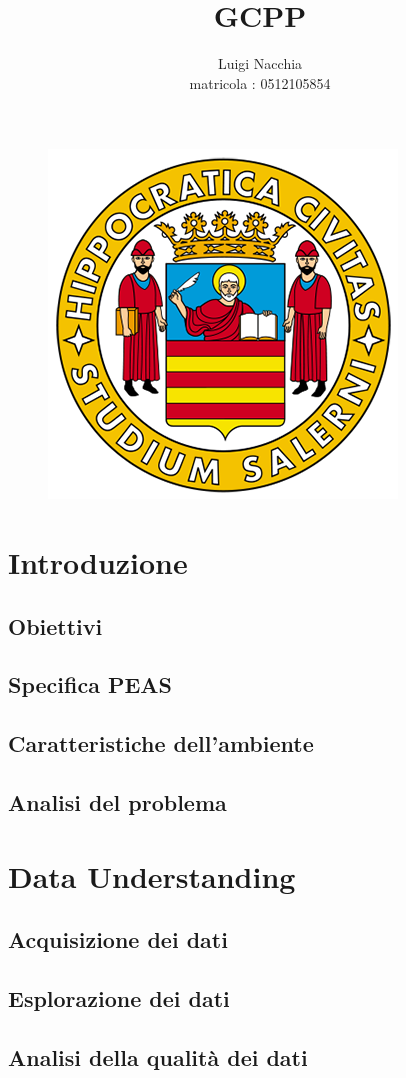 \documentclass{article}
\title{GCPP}
\author{Luigi Nacchia\\matricola : 0512105854}
\date{}
\begin{document}
\begin{figure}
    \centering
    \includegraphics[width=0.25\linewidth]{logo_unisa.png}
\end{figure}

\maketitle

\newpage
\tableofcontents

\newpage
\section{Introduzione}
    \subsection{Obiettivi}
    \subsection{Specifica PEAS}
    \subsection{Caratteristiche dell'ambiente}
    \subsection{Analisi del problema}

\newpage
    \section{Data Understanding}
    \subsection{Acquisizione dei dati}
    \subsection{Esplorazione dei dati}
    \subsection{Analisi della qualità dei dati}
\end{document}
